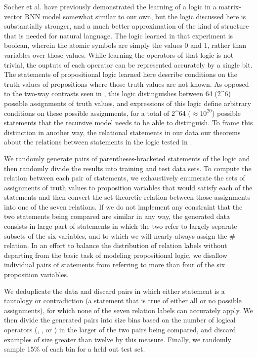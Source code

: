 Socher et al. \cite{socher2012semantic} have previously demonstrated the learning of a logic in a matrix-vector RNN model somewhat similar to our own, but the logic discussed here is substantially stronger, and a much better approximation of the kind of structure that is needed for natural language. The logic learned in that experiment is boolean, wherein the atomic symbols are simply the values 0 and 1, rather than variables over those values. While learning the operators of that logic is not trivial, the ouptuts of each operator can be represented accurately by a single bit. The statements of propositional logic learned here describe conditions on the truth values of propositions where those truth values are not known. As opposed to the two-way contrasts seen in \cite{socher2012semantic}, this logic distinguishes between 64 (2^6) possible assignments of truth values, and expressions of this logic define arbitrary conditions on these possible assignments, for a total of 2^{64} ($\approx 10^{20}$) possible statements that the recursive model needs to be able to distinguish. To frame this distinction in another way, the relational statements in our data our theorems about the relations between statements in the logic tested in \cite{socher2012semantic}.

We randomly generate pairs of parentheses-bracketed statements of the logic and then randomly divide the results into training and test data sets. To compute the relation between each pair of statements, we exhaustively enumerate the sets of assignments of truth values to proposition variables that would satisfy each of the statements and then convert the set-theoretic relation between those assignments into one of the seven relations. If we do not implement any constraint that the two statements being compared are similar in any way, the generated data consists in large part of statements in which the two refer to largely separate subsets of the six variables, and to which we will nearly always assign the \# relation. In an effort to balance the distribution of relation labels without departing from the basic task of modeling propositional logic, we disallow individual pairs of statements from referring to more than four of the six proposition variables. 

We deduplicate the data and discard pairs in which either statement is a tautology or contradiction (a statement that is true of either all or no possible assignments), for which none of the seven relation labels can accurately apply. We then divide the generated pairs into size bins based on the number of logical operators (, , or ) in the larger of the two pairs being compared, and discard examples of size greater than twelve by this measure. Finally, we randomly sample 15\% of each bin for a held out test set. 


